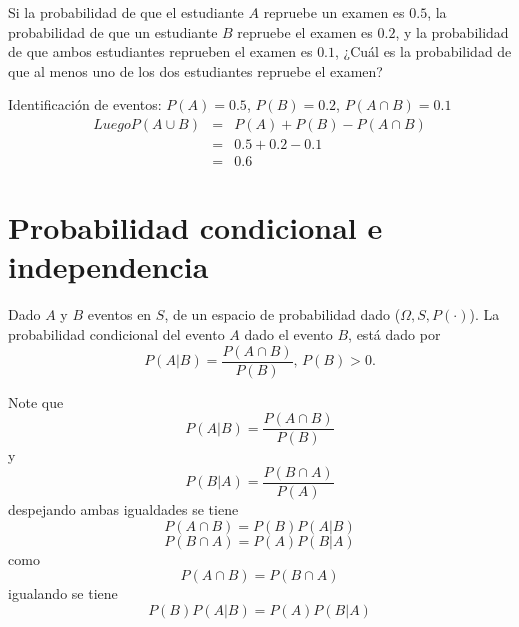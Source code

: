 \begin{exercise}
Si la probabilidad de que el estudiante $A$ repruebe un examen es $0.5$, la probabilidad de que un estudiante $B$ repruebe el examen es $0.2$, y la probabilidad de que ambos estudiantes reprueben el examen es $0.1$, ¿Cuál es la probabilidad de que al menos uno de los dos estudiantes repruebe el examen? 
\end{exercise}

\begin{solution}
 Identificación de eventos:
$P(A)=0.5$, $P(B)=0.2$, $P(A\cap B)=0.1$
\begin{eqnarray*}
Luego
P(A\cup B) &=&P(A)+P(B)-P(A\cap B) \\
           &=&0.5+0.2-0.1 \\
           &=&0.6
\end{eqnarray*}   
\end{solution}


\section{Probabilidad condicional e independencia}

\begin{definition}
Dado $A$ y $B$ eventos en $S$, de un espacio de probabilidad dado ($\Omega,S,P(\cdot)$). La probabilidad condicional del evento $A$ dado el evento $B$, está dado por 
\begin{equation*}
P(A\left\vert B\right. )=\frac{P(A\cap B)}{P(B)}\text{, }P(B)>0.
\end{equation*}
\end{definition}

Note que
\begin{equation*}
P(A\left\vert B\right. )=\frac{P(A\cap B)}{P(B)}
\end{equation*}
y 
\begin{equation*}
P(B\left\vert A\right. )=\frac{P(B\cap A)}{P(A)}
\end{equation*}
despejando ambas igualdades se tiene
\begin{equation*}
P(A\cap B)=P(B)P(A\left\vert B\right. )
\end{equation*}
\begin{equation*}
P(B\cap A)=P(A)P(B\left\vert A\right. )
\end{equation*}
como
\begin{equation*}
P(A\cap B)=P(B\cap A)
\end{equation*}
igualando se tiene
\begin{equation*}
P(B)P(A\left\vert B\right. )=P(A)P(B\left\vert A\right. )
\end{equation*}

